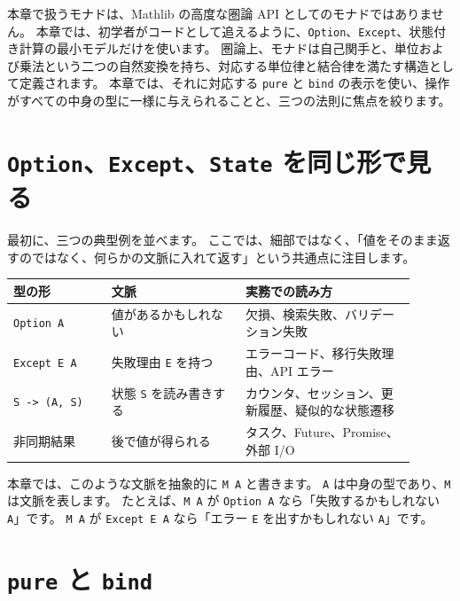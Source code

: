 
本章で扱うモナドは、Mathlib の高度な圏論 API としてのモナドではありません。
本章では、初学者がコードとして追えるように、\texttt{Option}、\texttt{Except}、状態付き計算の最小モデルだけを使います。
圏論上、モナドは自己関手と、単位および乗法という二つの自然変換を持ち、対応する単位律と結合律を満たす構造として定義されます。
本章では、それに対応する \texttt{pure} と \texttt{bind} の表示を使い、操作がすべての中身の型に一様に与えられることと、三つの法則に焦点を絞ります。

\section{\texttt{Option}、\texttt{Except}、\texttt{State} を同じ形で見る}

最初に、三つの典型例を並べます。
ここでは、細部ではなく、「値をそのまま返すのではなく、何らかの文脈に入れて返す」という共通点に注目します。

\begin{center}
\begin{tabular}{p{0.22\linewidth}p{0.30\linewidth}p{0.38\linewidth}}
\toprule
型の形 & 文脈 & 実務での読み方 \\
\midrule
\texttt{Option A} & 値があるかもしれない & 欠損、検索失敗、バリデーション失敗 \\
\texttt{Except E A} & 失敗理由 \texttt{E} を持つ & エラーコード、移行失敗理由、API エラー \\
\texttt{S -> (A, S)} & 状態 \texttt{S} を読み書きする & カウンタ、セッション、更新履歴、疑似的な状態遷移 \\
非同期結果 & 後で値が得られる & タスク、Future、Promise、外部 I/O \\
\bottomrule
\end{tabular}
\end{center}

本章では、このような文脈を抽象的に \texttt{M A} と書きます。
\texttt{A} は中身の型であり、\texttt{M} は文脈を表します。
たとえば、\texttt{M A} が \texttt{Option A} なら「失敗するかもしれない \texttt{A}」です。
\texttt{M A} が \texttt{Except E A} なら「エラー \texttt{E} を出すかもしれない \texttt{A}」です。

\section{\texttt{pure} と \texttt{bind}}

